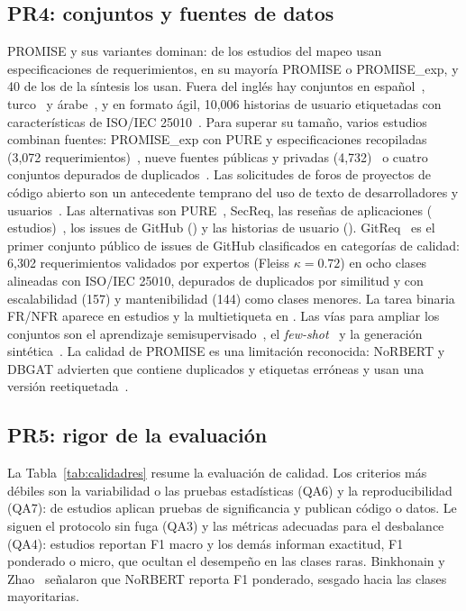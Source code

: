\documentclass[conference]{IEEEtran}
\begin{document}
\subsection{PR4: conjuntos y fuentes de datos}\label{sec:pr4}
PROMISE y sus variantes dominan: \nMapeoPROMISE{} de los \nMapeo{} estudios del mapeo usan especificaciones de requerimientos, en su mayoría PROMISE o PROMISE\_exp, y 40 de los \nSintesis{} de la síntesis los usan. Fuera del inglés hay conjuntos en español~\cite{Limaylla2025-Spanish}, turco~\cite{Yucalar2023-Developing} y árabe~\cite{Yahya2023-Novel}, y en formato ágil, 10,006 historias de usuario etiquetadas con características de ISO/IEC 25010~\cite{Alhaizaey2025-AgilePLM}. Para superar su tamaño, varios estudios combinan fuentes: PROMISE\_exp con PURE y especificaciones recopiladas (3,072 requerimientos)~\cite{Kaur2026-Hybrid}, nueve fuentes públicas y privadas (4,732)~\cite{Alsanoosy2025-Large} o cuatro conjuntos depurados de duplicados~\cite{NguyenVan2026-Evaluating}. Las solicitudes de foros de proyectos de código abierto son un antecedente temprano del uso de texto de desarrolladores y usuarios~\cite{Li2018-Automatically}. Las alternativas son PURE~\cite{Khayashi2026-Deep,Shreda2025-Identifying}, SecReq, las reseñas de aplicaciones (\nMapeoResenas{} estudios)~\cite{Chaudhary2025-Exploring,Alsaleh2025-Hybrid,Groen2025-Classification,Wellhausen2026-UserReviews}, los issues de GitHub (\nMapeoIssues) y las historias de usuario (\nMapeoHistorias). GitReq~\cite{Kamal2026-GitReq} es el primer conjunto público de issues de GitHub clasificados en categorías de calidad: 6,302 requerimientos validados por expertos (Fleiss $\kappa = 0.72$) en ocho clases alineadas con ISO/IEC 25010, depurados de duplicados por similitud y con escalabilidad (157) y mantenibilidad (144) como clases menores. La tarea binaria FR/NFR aparece en \nMapeoBinaria{} estudios y la multietiqueta en \nMapeoMultiet. Las vías para ampliar los conjuntos son el aprendizaje semisupervisado~\cite{Deocadez2017-Automatically}, el \emph{few-shot}~\cite{Saleem2025-Analyzing} y la generación sintética~\cite{Pham2025-Generating}. La calidad de PROMISE es una limitación reconocida: NoRBERT y DBGAT advierten que contiene duplicados y etiquetas erróneas y usan una versión reetiquetada~\cite{Hey2020-NoRBERT,Li2022-Automatic}.

\subsection{PR5: rigor de la evaluación}\label{sec:pr5}
La Tabla~\ref{tab:calidadres} resume la evaluación de calidad. Los criterios más débiles son la variabilidad o las pruebas estadísticas (QA6) y la reproducibilidad (QA7): \nEstad{} de \nSintesis{} estudios aplican pruebas de significancia y \nCodigo{} publican código o datos. Le siguen el protocolo sin fuga (QA3) y las métricas adecuadas para el desbalance (QA4): \nMacro{} estudios reportan F1 macro y los demás informan exactitud, F1 ponderado o micro, que ocultan el desempeño en las clases raras. Binkhonain y Zhao~\cite{Binkhonain2023-Machine} señalaron que NoRBERT reporta F1 ponderado, sesgado hacia las clases mayoritarias.
\end{document}
